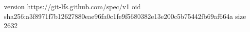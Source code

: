 version https://git-lfs.github.com/spec/v1
oid sha256:a3f8971f7b12627880eae96fa0c1fe9f5680382e13e200c5b75442fb69af664a
size 2632

